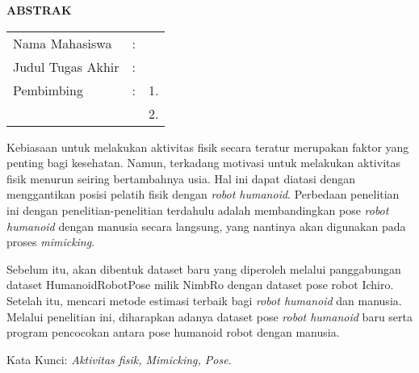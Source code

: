 \begin{center}
  \large\textbf{ABSTRAK}
\end{center}


\vspace{2ex}

\begingroup
\setlength{\tabcolsep}{0pt}

\noindent
\begin{tabularx}{\textwidth}{l >{\centering}m{2em} X}
  Nama Mahasiswa    & : & \name{}         \\

  Judul Tugas Akhir & : & \tatitle{}      \\

  Pembimbing        & : & 1. \advisor{}   \\
                    &   & 2. \coadvisor{} \\
\end{tabularx}
\endgroup

Kebiasaan untuk melakukan aktivitas fisik secara teratur merupakan faktor yang penting bagi kesehatan. 
Namun, terkadang motivasi untuk melakukan aktivitas fisik menurun seiring bertambahnya usia.
Hal ini dapat diatasi dengan menggantikan posisi pelatih fisik dengan \emph{robot humanoid}. 
Perbedaan penelitian ini dengan penelitian-penelitian terdahulu adalah membandingkan pose \emph{robot humanoid} dengan manusia secara langsung, 
yang nantinya akan digunakan pada proses \emph{mimicking}. 

Sebelum itu, akan dibentuk dataset baru yang diperoleh melalui panggabungan  dataset HumanoidRobotPose milik NimbRo dengan dataset pose robot Ichiro. 
Setelah itu, mencari metode estimasi terbaik bagi \emph{robot humanoid} dan manusia. 
Melalui penelitian ini, diharapkan adanya dataset pose \emph{robot humanoid} baru serta program pencocokan antara pose humanoid robot dengan manusia.

Kata Kunci: \emph{Aktivitas fisik, Mimicking, Pose}.
